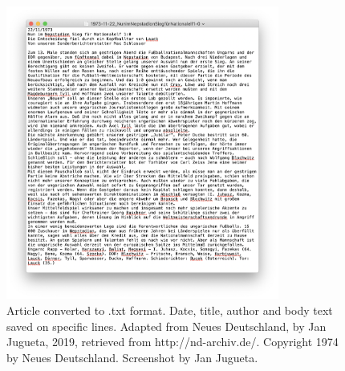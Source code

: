 \documentclass[unknownkeysallowed,usepdftitle=false,aspectratio=169, parskip=full]{beamer}
\begin{document}
\begin{frame}
\begin{columns}[t]
\begin{column}[c]{0.45\textwidth}
\begin{figure}[h]
\includegraphics[width=0.8\textwidth,height=0.8\textheight,keepaspectratio]{figure/nuntxt.png}
\caption{Article converted to .txt format. Date, title, author and body text saved on specific lines. Adapted from Neues Deutschland, by Jan Jugueta, 2019, retrieved from http://nd-archiv.de/. Copyright 1974 by Neues Deutschland.
Screenshot by Jan Jugueta.}
\end{figure}
    \end{column}
    
  \end{columns}

  
\end{frame}
\end{document}
